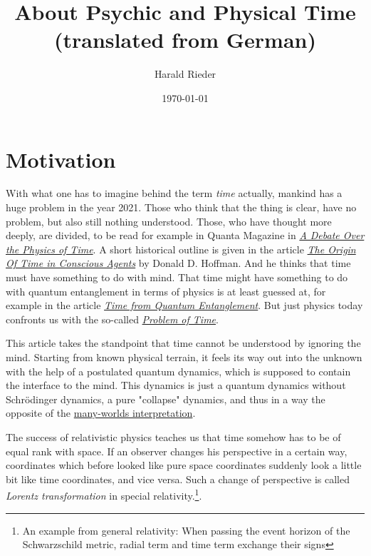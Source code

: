 \documentclass[12pt]{article}
\begin{document}
\title{\fontsize{25}{25}\selectfont \textbf{About Psychic and Physical Time} \\
\fontsize{12pt}{12pt}\selectfont (translated from German)}
\author{Harald Rieder}
\date{\today}
\maketitle



\tableofcontents

\section{Motivation}

With what one has to imagine behind the term \emph{time} actually, mankind has a huge problem in the year 2021. Those who think that the thing is clear, have no problem, but  also still nothing understood. Those, who have thought more deeply, are divided, to be read for example in Quanta Magazine in \emph{\href{https://www.quantamagazine.org/a-debate-over-the-physics-of-time-20160719/}{A Debate Over the Physics of Time}}. A short historical outline is given in the article \emph{\href{http://cogsci.uci.edu/~ddhoff/HoffmanTime.pdf}{The Origin Of Time in Conscious Agents}} by Donald D. Hoffman. And he thinks that time must have something to do with mind. That time might have something to do with quantum entanglement in terms of physics is at least guessed at, for example in the article \emph{\href{https://arxiv.org/abs/1310.4691}{Time from Quantum Entanglement}}. But just physics today confronts us with the so-called \emph{\href{https://en.wikipedia.org/wiki/Problem_of_time}{Problem of Time}}. 

This article takes the standpoint that time cannot be understood by ignoring the mind. Starting from known physical terrain, it feels its way out into the unknown with the help of a postulated quantum dynamics, which is supposed to contain the interface to the mind. This dynamics is just a quantum dynamics without Schrödinger dynamics, a pure "collapse" dynamics, and thus in a way the opposite of the \href{https://en.wikipedia.org/wiki/Many-worlds_interpretation}{many-worlds interpretation}.

The success of relativistic physics teaches us that time somehow has to be of equal rank with space. If an observer changes his perspective in a certain way, coordinates which before looked like pure space coordinates suddenly look a little bit like time coordinates, and vice versa. Such a change of perspective is called \emph{Lorentz transformation} in special relativity.\footnote{An example from general relativity: When passing the event horizon of the Schwarzschild metric, radial term and time term exchange their signs}. 
\end{document}
